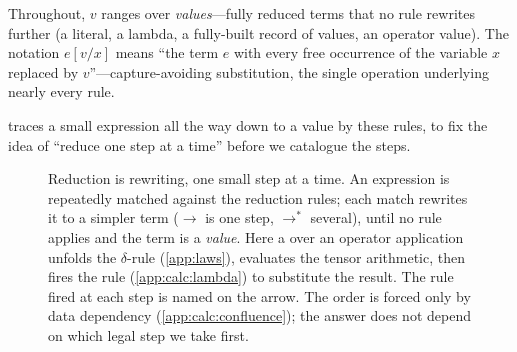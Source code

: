 Throughout, $v$ ranges over \emph{values}---fully reduced terms that no rule
rewrites further (a literal, a lambda, a fully-built record of values, an operator
value). The notation $e[v/x]$ means ``the term $e$ with every free occurrence of
the variable $x$ replaced by $v$''---capture-avoiding substitution, the single
operation underlying nearly every rule.

 traces a small expression all the way down to a value
by these rules, to fix the idea of ``reduce one step at a time'' before we
catalogue the steps.

\begin{figure}[t]
\centering
{}
\caption[A term reducing step by step]{Reduction is rewriting, one small step at
a time. An expression is repeatedly matched against the reduction rules; each
match rewrites it to a simpler term ($\to$ is one step, $\to^{*}$ several), until
no rule applies and the term is a \emph{value}. Here a  over an
operator application unfolds the  $\delta$-rule (\cref{app:laws}),
evaluates the tensor arithmetic, then fires the  rule
(\cref{app:calc:lambda}) to substitute the result. The rule fired at each step is
named on the arrow. The order is forced only by data dependency
(\cref{app:calc:confluence}); the answer does not depend on which legal step we
take first.}
\label{fig:appA:reduction}
\end{figure}

